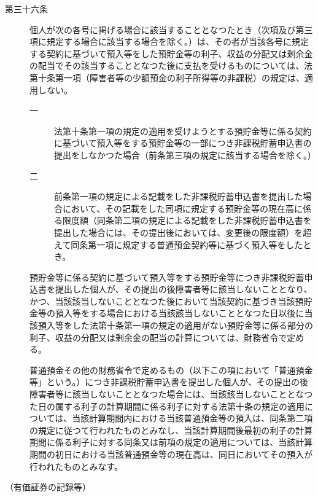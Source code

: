 \documentclass[twocolumn,a4j,10pt]{ltjtarticle}
\begin{document}
\begin{description}
\item[第三十六条]個人が次の各号に掲げる場合に該当することとなつたとき（次項及び第三項に規定する場合に該当する場合を除く。）は、その者が当該各号に規定する契約に基づいて預入等をした預貯金等の利子、収益の分配又は剰余金の配当でその該当することとなつた後に支払を受けるものについては、法第十条第一項（障害者等の少額預金の利子所得等の非課税）の規定は、適用しない。
\begin{description}
\item[一]法第十条第一項の規定の適用を受けようとする預貯金等に係る契約に基づいて預入等をする預貯金等の一部につき非課税貯蓄申込書の提出をしなかつた場合（前条第三項の規定に該当する場合を除く。）
\item[二]前条第一項の規定による記載をした非課税貯蓄申込書を提出した場合において、その記載をした同項に規定する預貯金等の現在高に係る限度額（同条第二項の規定による記載をした非課税貯蓄申込書を提出した場合には、その提出後においては、変更後の限度額）を超えて同条第一項に規定する普通預金契約等に基づく預入等をしたとき。
\end{description}
\item[]預貯金等に係る契約に基づいて預入等をする預貯金等につき非課税貯蓄申込書を提出した個人が、その提出の後障害者等に該当しないこととなり、かつ、当該該当しないこととなつた後において当該契約に基づき当該預貯金等の預入等をする場合における当該該当しないこととなつた日以後に当該預入等をした法第十条第一項の規定の適用がない預貯金等に係る部分の利子、収益の分配又は剰余金の配当の計算については、財務省令で定める。
\item[]普通預金その他の財務省令で定めるもの（以下この項において「普通預金等」という。）につき非課税貯蓄申込書を提出した個人が、その提出の後障害者等に該当しないこととなつた場合には、当該該当しないこととなつた日の属する利子の計算期間に係る利子に対する法第十条の規定の適用については、当該計算期間内における当該普通預金等の預入は、同条第二項の規定に従つて行われたものとみなし、当該計算期間後最初の利子の計算期間に係る利子に対する同条又は前項の規定の適用については、当該計算期間の初日における当該普通預金等の現在高は、同日においてその預入が行われたものとみなす。
\end{description}
\noindent\hspace{10pt}（有価証券の記録等）
\end{document}
